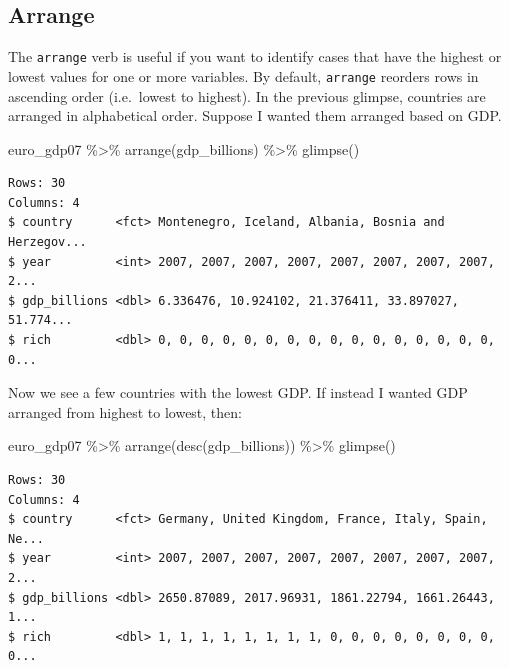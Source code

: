 \documentclass[
]{book}
\makeatletter
\newenvironment{Shaded}{\begin{snugshade}}{\end{snugshade}}
\newcommand{\FunctionTok}[1]{\textcolor[rgb]{0,0,0}{#1}}
\newcommand{\NormalTok}[1]{#1}
\newcommand{\SpecialCharTok}[1]{\textcolor[rgb]{0,0,0}{#1}}
\newenvironment{kframe}{%
\medskip{}
\setlength{\fboxsep}{.8em}
 \def\at@end@of@kframe{}%
 \ifinner\ifhmode%
  \def\at@end@of@kframe{\end{minipage}}%
  \begin{minipage}{\columnwidth}%
 \fi\fi%
 \def\FrameCommand##1{\hskip\@totalleftmargin \hskip-\fboxsep
 \colorbox{shadecolor}{##1}\hskip-\fboxsep
     \hskip-\linewidth \hskip-\@totalleftmargin \hskip\columnwidth}%
 \MakeFramed {\advance\hsize-\width
   \@totalleftmargin\z@ \linewidth\hsize
   \@setminipage}}%
 {\par\unskip\endMakeFramed%
 \at@end@of@kframe}
\renewenvironment{Shaded}{\begin{kframe}}{\end{kframe}}
\makeatother
\begin{document}
\hypertarget{arrange}{%
\subsection{Arrange}\label{arrange}}

The \texttt{arrange} verb is useful if you want to identify cases that have the highest or lowest values for one or more variables. By default, \texttt{arrange} reorders rows in ascending order (i.e.~lowest to highest). In the previous glimpse, countries are arranged in alphabetical order. Suppose I wanted them arranged based on GDP.

\begin{Shaded}
\begin{Highlighting}[]
\NormalTok{euro\_gdp07 }\SpecialCharTok{\%\textgreater{}\%} 
  \FunctionTok{arrange}\NormalTok{(gdp\_billions) }\SpecialCharTok{\%\textgreater{}\%} 
  \FunctionTok{glimpse}\NormalTok{()}
\end{Highlighting}
\end{Shaded}

\begin{verbatim}
Rows: 30
Columns: 4
$ country      <fct> Montenegro, Iceland, Albania, Bosnia and Herzegov...
$ year         <int> 2007, 2007, 2007, 2007, 2007, 2007, 2007, 2007, 2...
$ gdp_billions <dbl> 6.336476, 10.924102, 21.376411, 33.897027, 51.774...
$ rich         <dbl> 0, 0, 0, 0, 0, 0, 0, 0, 0, 0, 0, 0, 0, 0, 0, 0, 0...
\end{verbatim}

Now we see a few countries with the lowest GDP. If instead I wanted GDP arranged from highest to lowest, then:

\begin{Shaded}
\begin{Highlighting}[]
\NormalTok{euro\_gdp07 }\SpecialCharTok{\%\textgreater{}\%} 
  \FunctionTok{arrange}\NormalTok{(}\FunctionTok{desc}\NormalTok{(gdp\_billions)) }\SpecialCharTok{\%\textgreater{}\%} 
  \FunctionTok{glimpse}\NormalTok{()}
\end{Highlighting}
\end{Shaded}

\begin{verbatim}
Rows: 30
Columns: 4
$ country      <fct> Germany, United Kingdom, France, Italy, Spain, Ne...
$ year         <int> 2007, 2007, 2007, 2007, 2007, 2007, 2007, 2007, 2...
$ gdp_billions <dbl> 2650.87089, 2017.96931, 1861.22794, 1661.26443, 1...
$ rich         <dbl> 1, 1, 1, 1, 1, 1, 1, 1, 0, 0, 0, 0, 0, 0, 0, 0, 0...
\end{verbatim}
\end{document}
